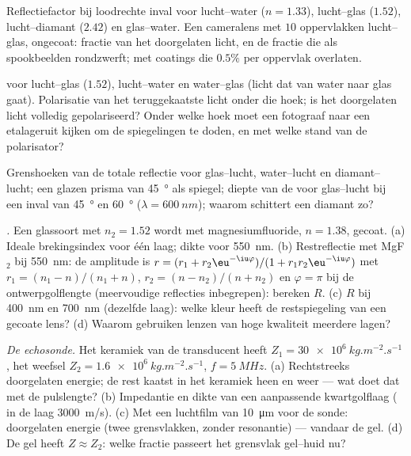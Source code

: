 \begin{exercise}[$\star$]\label{exo:b2:wave-interfaces:2}
Reflectiefactor bij loodrechte inval voor lucht--water ($n = 1.33$),
lucht--glas ($1.52$), lucht--diamant ($2.42$) en glas--water. Een cameralens
met $10$ oppervlakken lucht--glas, ongecoat: fractie van het doorgelaten
licht, en de fractie die als spookbeelden rondzwerft; met coatings die
$0.5\%$ per oppervlak overlaten.
\end{exercise}

\begin{exercise}[$\star$]\label{exo:b2:wave-interfaces:3}
 voor lucht--glas ($1.52$), lucht--water en water--glas
(licht dat van water naar glas gaat). Polarisatie van het teruggekaatste
licht onder die hoek; is het doorgelaten licht volledig gepolariseerd? Onder
welke hoek moet een fotograaf naar een etalageruit kijken om de spiegelingen
te doden, en met welke stand van de polarisator?
\end{exercise}

\begin{exercise}[$\star$]\label{exo:b2:wave-interfaces:4}
Grenshoeken van de totale reflectie voor glas--lucht, water--lucht en
diamant--lucht; een glazen prisma van \qty{45}{\degree} als spiegel; diepte
van de  voor glas--lucht bij een inval van \qty{45}{\degree}
en \qty{60}{\degree} ($\lambda = \qty{600}{nm}$); waarom schittert een
diamant zo?
\end{exercise}

\begin{exercise}[$\star\star$]\label{exo:b2:wave-interfaces:5}
\emph{.} Een glassoort met $n_2 = 1.52$ wordt met
magnesiumfluoride, $n = 1.38$, gecoat. (a) Ideale brekingsindex voor één
laag; dikte voor \qty{550}{nm}. (b) Restreflectie met MgF$_2$ bij
\qty{550}{nm}: de amplitude is
$r = (r_1 + r_2\eu^{-\iu\varphi})/(1 + r_1r_2
\eu^{-\iu\varphi})$ met
$r_1 = (n_1 - n)/(n_1 + n)$, $r_2 = (n - n_2)/(n + n_2)$ en $\varphi = \pi$
bij de ontwerpgolflengte (meervoudige reflecties inbegrepen): bereken $R$.
(c) $R$ bij \qty{400}{nm} en \qty{700}{nm} (dezelfde laag): welke kleur
heeft de restspiegeling van een gecoate lens? (d) Waarom gebruiken lenzen
van hoge kwaliteit meerdere lagen?
\end{exercise}

\begin{exercise}[$\star\star$]\label{exo:b2:wave-interfaces:6}
\emph{De echosonde.} Het keramiek van de transducent heeft
$Z_1 = \qty{30e6}{kg.m^{-2}.s^{-1}}$, het weefsel
$Z_2 = \qty{1.6e6}{kg.m^{-2}.s^{-1}}$, $f = \qty{5}{MHz}$. (a) Rechtstreeks
doorgelaten energie; de rest kaatst in het keramiek heen en weer --- wat
doet dat met de pulslengte? (b) Impedantie en dikte van een aanpassende
kwartgolflaag ( in de laag \qty{3000}{m/s}). (c) Met een
luchtfilm van \qty{10}{\micro m} voor de sonde: doorgelaten energie (twee
grensvlakken, zonder resonantie) --- vandaar de gel. (d) De gel heeft
$Z \approx Z_2$: welke fractie passeert het grensvlak gel--huid nu?
\end{exercise}

